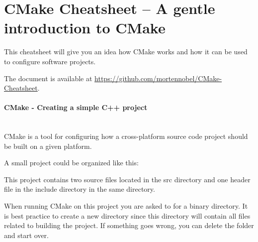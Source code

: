 \documentclass[11pt,a4paper,landscape]{scrartcl} %
\newcommand{\sectiontitle}[1]{\paragraph{#1} \ \\} %
\begin{document}


\section*{CMake Cheatsheet -- A gentle introduction to CMake} %



\setlength{\columnsep}{1.5cm}
\begin{multicols}{2}


This cheatsheet will give you an idea how CMake works and how it can be used to configure software projects.

The document is available at  \url{https://github.com/mortennobel/CMake-Cheatsheet}. 

\sectiontitle{CMake - Creating a simple C++ project}
			 
CMake is a tool for configuring how a cross-platform source code project should be built on a given platform. 

A small project could be organized like this: 

\vspace{\baselineskip} %

\noindent{}

\vspace{\baselineskip} %

This project contains two source files located in the src directory and one header file in the include directory in the same directory.

When running CMake on this project you are asked to for a binary directory. It is best practice to create a new directory since this directory will contain all files related to building the project. If something goes wrong, you can delete the folder and start over.


\end{multicols}
\end{document}
